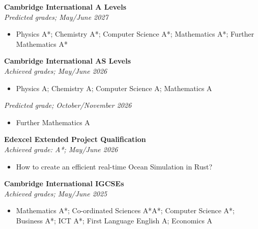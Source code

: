 \documentclass[10pt,a4paper,ragged2e, normalphoto]{altacv}
\begin{document}

\begin{fullwidth}
	\makecvheader
\end{fullwidth}



\medskip

\textbf{Cambridge International A Levels}\\
\textit{Predicted grades; May/June 2027}
\begin{itemize}
	\item Physics A*; Chemistry A*; Computer Science A*;
	      Mathematics A*; Further Mathematics A*
\end{itemize}

\divider

\textbf{Cambridge International AS Levels}\\
\textit{Achieved grades; May/June 2026}
\begin{itemize}
	\item Physics A; Chemistry A; Computer Science A;
	      Mathematics A
\end{itemize}

\smallskip

\textit{Predicted grade; October/November 2026}
\begin{itemize}
	\item Further Mathematics A
\end{itemize}

\divider

\textbf{Edexcel Extended Project Qualification}\\
\textit{Achieved grade: A*; May/June 2026}
\begin{itemize}
	\item How to create an efficient real-time Ocean Simulation in Rust?
\end{itemize}

\divider

\textbf{Cambridge International IGCSEs}\\
\textit{Achieved grades; May/June 2025}
\begin{itemize}
	\item Mathematics A*; Co-ordinated Sciences A*A*;
	      Computer Science A*; Business A*; ICT A*;
	      First Language English A; Economics A
\end{itemize}
\end{document}
